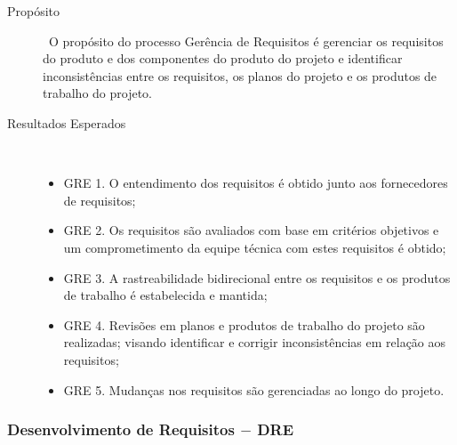   \begin{description}
    \item[Propósito] \
      O propósito do processo Gerência de Requisitos é gerenciar os requisitos do
      produto e dos componentes do produto do projeto e identificar inconsistências
      entre os requisitos, os planos do projeto e os produtos de trabalho do projeto.
    \item [Resultados Esperados] \
      \begin{itemize}
        \item GRE 1. O entendimento dos requisitos é obtido junto aos fornecedores de requisitos;
        \item GRE 2. Os requisitos são avaliados com base em critérios objetivos e um comprometimento
              da equipe técnica com estes requisitos é obtido;
        \item GRE 3. A rastreabilidade bidirecional entre os requisitos e os produtos de trabalho
              é estabelecida e mantida;
        \item GRE 4. Revisões em planos e produtos de trabalho do projeto são realizadas;
              visando identificar e corrigir inconsistências em relação aos requisitos;
        \item GRE 5. Mudanças nos requisitos são gerenciadas ao longo do projeto.
      \end{itemize}
    \end{description}

\subsubsection{Desenvolvimento de Requisitos $-$ DRE}

